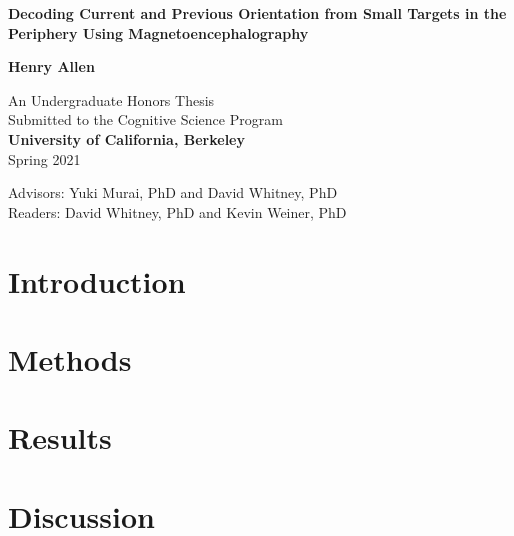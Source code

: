 \documentclass[letterpaper, 12pt]{article}
\begin{document}
\begin{titlepage}
   \begin{center}
       \vspace*{1cm}

       \Huge
       \textbf{Decoding Current and Previous Orientation from Small Targets in the Periphery Using Magnetoencephalography}

       \vspace{0.5cm}

       \Large    
       \vspace{1.1cm}

       \textbf{Henry Allen}

       \vfill
            
       \vspace{0.4cm}
     

       \Large            
       An Undergraduate Honors Thesis\\
       Submitted to the Cognitive Science Program\\
       \textbf{University of California, Berkeley}\\
       \vspace{0.4cm}
       Spring 2021
       
       \vfill
       
       \vspace{0.4cm}
       \Large
       Advisors: Yuki Murai, PhD and David Whitney, PhD\\
       Readers: David Whitney, PhD and Kevin Weiner, PhD\\
       
       
       
            
   \end{center}
\end{titlepage}

\abstract{
  
}

\section*{Introduction}


\section*{Methods}


\section*{Results}


\section*{Discussion}



\end{document}
